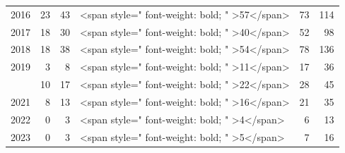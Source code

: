 \begin{table}[!h]
\begin{tabular}[t]{lrrlrr}
2016 & 23 & 43 & <span style=" font-weight: bold;    " >57</span> & 73 & 114\\
2017 & 18 & 30 & <span style=" font-weight: bold;    " >40</span> & 52 & 98\\
2018 & 18 & 38 & <span style=" font-weight: bold;    " >54</span> & 78 & 136\\
2019 & 3 & 8 & <span style=" font-weight: bold;    " >11</span> & 17 & 36\\
\addlinespace
2020 & 10 & 17 & <span style=" font-weight: bold;    " >22</span> & 28 & 45\\
2021 & 8 & 13 & <span style=" font-weight: bold;    " >16</span> & 21 & 35\\
2022 & 0 & 3 & <span style=" font-weight: bold;    " >4</span> & 6 & 13\\
2023 & 0 & 3 & <span style=" font-weight: bold;    " >5</span> & 7 & 16\\
\bottomrule
\end{tabular}
\end{table}
